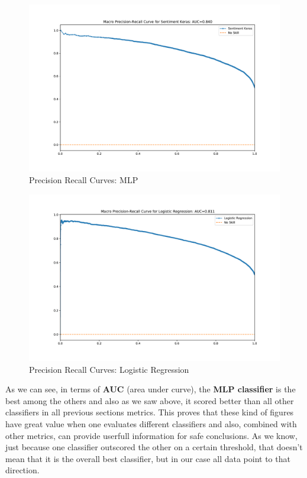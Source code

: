 \documentclass[10pt]{article}
\begin{document}
\begin{figure}[H]
\caption{Precision Recall Curves: MLP }
\includegraphics[width=\textwidth]{Sentiment Keras_PR_CURVE.pdf}
\end{figure}

\begin{figure}[H]
\caption{Precision Recall Curves: Logistic Regression}
\includegraphics[width=\textwidth]{Logistic Regression_PR_CURVE.pdf}
\end{figure}

\newpage
As we can see, in terms of \textbf{AUC} (area under curve), the \textbf{MLP classifier} is the best among the others and also as we saw above, it scored better than all other classifiers in all previous sections metrics. This proves that these kind of figures have great value when one evaluates different classifiers and also, combined with other metrics, can provide userfull information for safe conclusions. As we know, just because one classifier outscored the other on a certain threshold, that doesn't mean that it is the overall best classifier, but in our case all data point to that direction.
\end{document}
